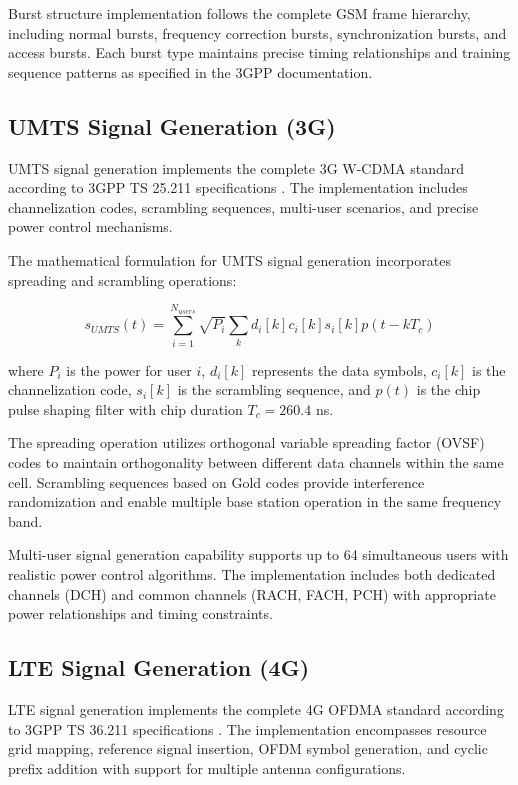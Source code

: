 \documentclass[twocolumn]{article}
\begin{document}
Burst structure implementation follows the complete GSM frame hierarchy, including normal bursts, frequency correction bursts, synchronization bursts, and access bursts. Each burst type maintains precise timing relationships and training sequence patterns as specified in the 3GPP documentation.

\subsection{UMTS Signal Generation (3G)}

UMTS signal generation implements the complete 3G W-CDMA standard according to 3GPP TS 25.211 specifications \cite{3gpp2018ts25211}. The implementation includes channelization codes, scrambling sequences, multi-user scenarios, and precise power control mechanisms.

The mathematical formulation for UMTS signal generation incorporates spreading and scrambling operations:

\begin{equation}
s_{UMTS}(t) = \sum_{i=1}^{N_{users}} \sqrt{P_i} \sum_{k} d_i[k] c_i[k] s_i[k] p(t-kT_c)
\end{equation}

where $P_i$ is the power for user $i$, $d_i[k]$ represents the data symbols, $c_i[k]$ is the channelization code, $s_i[k]$ is the scrambling sequence, and $p(t)$ is the chip pulse shaping filter with chip duration $T_c = 260.4$ ns.

The spreading operation utilizes orthogonal variable spreading factor (OVSF) codes to maintain orthogonality between different data channels within the same cell. Scrambling sequences based on Gold codes provide interference randomization and enable multiple base station operation in the same frequency band.

Multi-user signal generation capability supports up to 64 simultaneous users with realistic power control algorithms. The implementation includes both dedicated channels (DCH) and common channels (RACH, FACH, PCH) with appropriate power relationships and timing constraints.

\subsection{LTE Signal Generation (4G)}

LTE signal generation implements the complete 4G OFDMA standard according to 3GPP TS 36.211 specifications \cite{3gpp2018ts36211}. The implementation encompasses resource grid mapping, reference signal insertion, OFDM symbol generation, and cyclic prefix addition with support for multiple antenna configurations.
\end{document}
